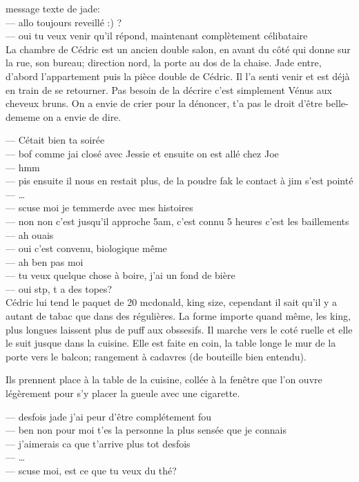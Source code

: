 \documentclass{article}
\begin{document}
message texte de jade:\\
--- allo toujours reveillé :) ?\\
--- oui tu veux venir qu'il répond, maintenant complètement célibataire\\

La chambre de Cédric est un ancien double salon, en avant du côté qui donne sur
la rue, son bureau; direction nord, la porte au dos de la chaise. Jade entre,
d'abord l'appartement puis la pièce double de Cédric. Il l'a senti venir et est
déjà en train de se retourner. Pas besoin de la décrire c'est simplement Vénus
aux cheveux bruns. On a envie de crier pour la dénoncer, t'a pas le droit d'être
belle-dememe on a envie de dire.


--- Cétait bien ta soirée\\
--- bof comme jai closé avec Jessie et ensuite on est allé chez Joe\\
--- hmm\\
--- pis ensuite il nous en restait plus, de la poudre fak le contact à jim s'est pointé\\
--- \ldots\\
--- scuse moi je temmerde avec mes histoires\\
--- non non c'est jusqu'il approche 5am, c'est connu 5 heures c'est les baillements\\
--- ah ouais\\
--- oui c'est convenu, biologique même\\
--- ah ben pas moi\\
--- tu veux quelque chose à boire, j'ai un fond de bière\\
--- oui stp, t a des topes?\\

Cédric lui tend le paquet de 20 mcdonald, king size, cependant il sait qu'il y a
autant de tabac que dans des régulières. La forme importe quand même, les king,
plus longues laissent plus de puff aux obssesifs. Il marche vers le coté ruelle et elle
le suit jusque dans la cuisine. Elle est faite en coin, la table longe le
mur de la porte vers le balcon; rangement à cadavres (de bouteille bien
entendu).

Ils prennent place à la table de la cuisine, collée à la fenêtre
que l'on ouvre légèrement pour s'y placer la gueule avec une cigarette.

--- desfois jade j'ai peur d'être complétement fou\\
--- ben non pour moi t'es la personne la plus sensée que je connais\\
--- j'aimerais ca que t'arrive plus tot desfois\\
--- \ldots\\
--- scuse moi, est ce que tu veux du thé?\\
\end{document}
